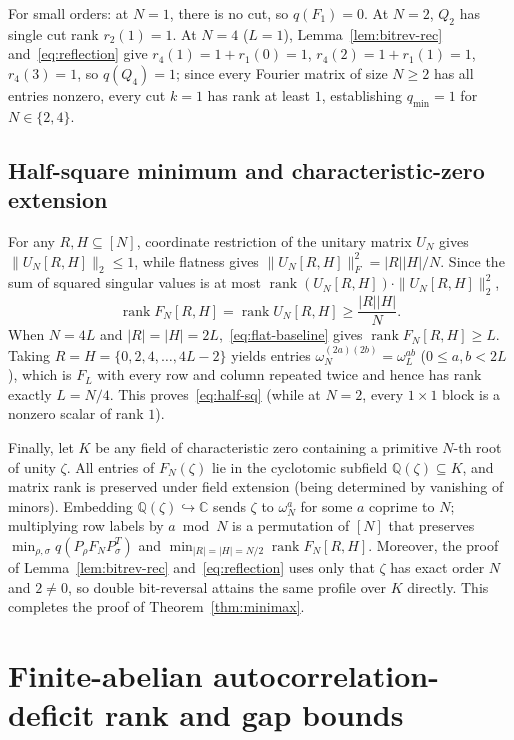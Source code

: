 \documentclass[11pt,reqno]{amsart}
\numberwithin{equation}{section}
\theoremstyle{definition}
\theoremstyle{remark}
\newcommand{\C}{\mathbb{C}}
\newcommand{\Q}{\mathbb{Q}}
\newcommand{\rank}{\operatorname{rank}}
\begin{document}
For small orders: at $N=1$, there is no cut, so $q(F_1)=0$. At $N=2$, $Q_2$ has single cut rank $r_2(1)=1$. At $N=4$ ($L=1$), Lemma~\ref{lem:bitrev-rec} and~\eqref{eq:reflection} give $r_4(1)=1+r_1(0)=1$, $r_4(2)=1+r_1(1)=1$, $r_4(3)=1$, so $q(Q_4)=1$; since every Fourier matrix of size $N\ge 2$ has all entries nonzero, every cut $k=1$ has rank at least $1$, establishing $q_{\min}=1$ for $N\in\{2,4\}$.

\subsection{Half-square minimum and characteristic-zero extension}

For any $R,H\subseteq[N]$, coordinate restriction of the unitary matrix $U_N$ gives $\|U_N[R,H]\|_2\le 1$, while flatness gives $\|U_N[R,H]\|_F^2 = |R||H|/N$. Since the sum of squared singular values is at most $\rank(U_N[R,H])\cdot \|U_N[R,H]\|_2^2$,
\begin{equation}
\label{eq:flat-baseline}
\rank F_N[R,H] = \rank U_N[R,H] \ge \frac{|R||H|}{N}.
\end{equation}
When $N=4L$ and $|R|=|H|=2L$,~\eqref{eq:flat-baseline} gives $\rank F_N[R,H]\ge L$. Taking $R=H=\{0,2,4,\ldots,4L-2\}$ yields entries $\omega_N^{(2a)(2b)} = \omega_L^{ab}$ ($0\le a,b<2L$), which is $F_L$ with every row and column repeated twice and hence has rank exactly $L=N/4$. This proves~\eqref{eq:half-sq} (while at $N=2$, every $1\times 1$ block is a nonzero scalar of rank $1$).

Finally, let $K$ be any field of characteristic zero containing a primitive $N$-th root of unity $\zeta$. All entries of $F_N(\zeta)$ lie in the cyclotomic subfield $\Q(\zeta)\subseteq K$, and matrix rank is preserved under field extension (being determined by vanishing of minors). Embedding $\Q(\zeta)\hookrightarrow\C$ sends $\zeta$ to $\omega_N^a$ for some $a$ coprime to $N$; multiplying row labels by $a\bmod N$ is a permutation of $[N]$ that preserves $\min_{\rho,\sigma} q(P_\rho F_N P_\sigma^T)$ and $\min_{|R|=|H|=N/2}\rank F_N[R,H]$. Moreover, the proof of Lemma~\ref{lem:bitrev-rec} and~\eqref{eq:reflection} uses only that $\zeta$ has exact order $N$ and $2\neq 0$, so double bit-reversal attains the same profile over $K$ directly. This completes the proof of Theorem~\ref{thm:minimax}.

\section{Finite-abelian autocorrelation-deficit rank and gap bounds}
\label{sec:deficit}
\end{document}
